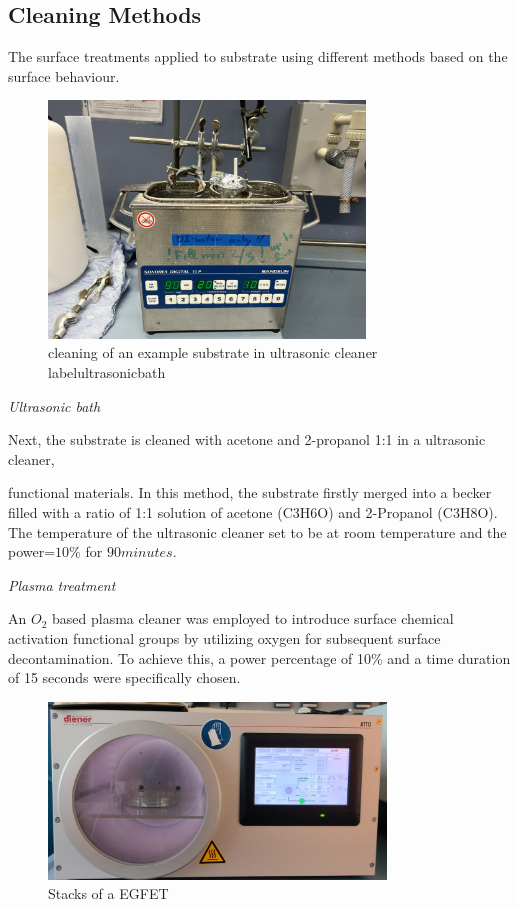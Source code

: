  
\subsection{Cleaning Methods}
 The surface treatments applied to substrate using different methods based on the surface behaviour.
 \begin{figure}[h!]
\centering
\includegraphics[width=0.75\textwidth]
{figures/ultrasonicbath.jpg}
\caption[Example of caption.]{cleaning of an example substrate in ultrasonic cleaner label{ultrasonicbath}}
\end{figure}

 
 \textit {Ultrasonic bath}

 Next, the substrate is cleaned with acetone
 and 2-propanol   1:1 in a ultrasonic cleaner, 
 
 functional materials.
 In this method, the substrate firstly merged into a becker filled with a ratio of 1:1 solution of acetone (C3H6O) and 2-Propanol (C3H8O). The temperature of the  ultrasonic cleaner set to be at room  temperature and the power=$10\%$ for $90 minutes$.
 
\textit{Plasma treatment}

An $O_2 $ based plasma cleaner was employed to introduce surface chemical activation functional groups by utilizing oxygen for subsequent surface decontamination. To achieve this, a power percentage of 10\% and a time duration of 15 seconds were specifically chosen.

 \begin{figure}[h!]
\centering
\includegraphics[width=0.8\textwidth]{figures/plasmatreatment.jpg}
\caption[Example of caption.]{Stacks of a EGFET \label{plasma}}
\end{figure}

